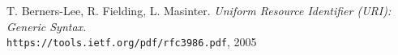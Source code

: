 \begin{thebibliography}{9}

T. Berners-Lee, R. Fielding, L. Masinter.
\textit{Uniform Resource Identifier (URI): Generic Syntax.} \\ 
\texttt{https://tools.ietf.org/pdf/rfc3986.pdf}, 2005

\end{thebibliography}